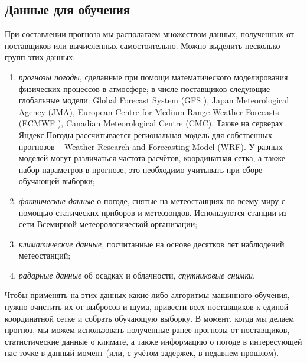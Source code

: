 \documentclass[14pt]{matmex-diploma}
\begin{document}
\subsection{Данные для обучения}
При составлении прогноза мы располагаем множеством данных, полученных от поставщиков или вычисленных самостоятельно. Можно выделить несколько групп этих данных:
\begin{enumerate}

    \item \textit{прогнозы погоды}, сделанные при помощи математического моделирования физических процессов в атмосфере; в числе поставщиков следующие глобальные модели: Global Forecast System (GFS \cite{saha2006ncep}), Japan Meteorological Agency (JMA), European Centre for Medium-Range Weather Forecasts (ECMWF \cite{persson2001user}), Canadian Meteorological Centre (CMC). Также на серверах Яндекс.Погоды рассчитывается региональная модель для собственных прогнозов -- Weather Research and Forecasting Model (WRF). У разных моделей могут различаться частота расчётов, координатная сетка, а также набор параметров в прогнозе, это необходимо учитывать при сборе обучающей выборки;

    \item \textit{фактические данные} о погоде, снятые на метеостанциях по всему миру с помощью статических приборов и метеозондов. Используются станции из сети Всемирной метеорологической организации;
    
    \item \textit{климатические данные}, посчитанные на основе десятков лет наблюдений метеостанций;

    \item \textit{радарные данные} об осадках и облачности, \textit{спутниковые снимки}.
\end{enumerate}

Чтобы применять на этих данных какие-либо алгоритмы машинного обучения, нужно очистить их от выбросов и шума, привести всех поставщиков к единой координатной сетке и собрать обучающую выборку. В момент, когда мы делаем прогноз, мы можем использовать полученные ранее прогнозы от поставщиков, статистические данные о климате, а также информацию о погоде в интересующей нас точке в данный момент (или, с учётом задержек, в недавнем прошлом).
\end{document}
